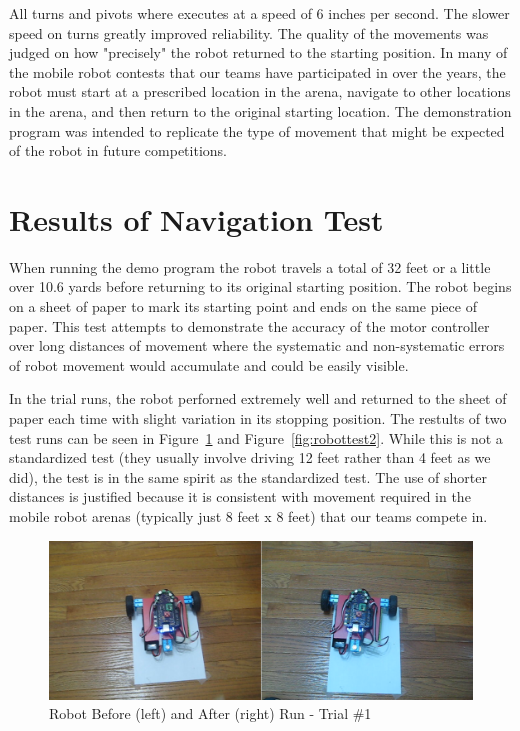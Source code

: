\documentclass[12pt,oneside,final]{siuethesis}
\theoremstyle{definition}
\begin{document}
All turns and pivots where executes at a speed of 6 inches per second.  The slower speed on turns greatly improved reliability. The quality of the movements was judged on how "precisely" the robot returned to the starting position.  In many of the mobile robot contests that our teams have participated in over the years, the robot must start at a prescribed location in the arena, navigate to other locations in the arena, and then return to the original starting location.  The demonstration program was intended to replicate the type of movement that might be expected of the robot in future competitions.

\section{Results of Navigation Test}

When running the demo program the robot travels a total of 32 feet or a little over 10.6 yards before returning to its original starting position. The robot begins on a sheet of paper to mark its starting point and ends on the same piece of paper. This test attempts to demonstrate the accuracy of the motor controller over long distances of movement where the systematic and non-systematic errors of robot movement would accumulate and could be easily visible. 

In the trial runs, the robot perforned extremely well and returned to the sheet of paper each time with slight variation in its stopping position. The restults of two test runs can be seen in Figure~\ref{fig:robottest1} and Figure~\ref{fig:robottest2}.  While this is not a standardized test (they usually involve driving 12 feet rather than 4 feet as we did), the test is in the same spirit as the standardized test.  The use of shorter distances is justified because it is consistent with movement required in the mobile robot arenas (typically just 8 feet x 8 feet) that our teams compete in.

\newpage
\begin{figure}[!t]
 \centering
 \includegraphics[scale=.35,keepaspectratio=true]{./images/robot-test1.png}
 \caption{Robot Before (left) and After (right) Run - Trial \#1}
 \label{fig:robottest1}
\end{figure}
\end{document}
